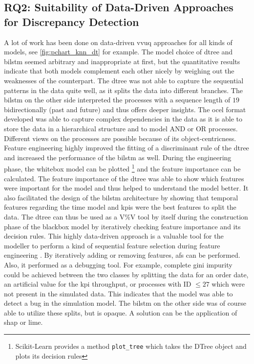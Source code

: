 \subsection{RQ2: Suitability of Data-Driven Approaches for Discrepancy Detection}
\label{sec:discussion_rq2}
A lot of work has been done on data-driven \gls{vvuq} approaches for all kinds of models, see \autoref{fig:pchart_knn_dt} for example. The model choice of \gls{dtree} and \gls{bilstm} seemed arbitrary and inappropriate at first, but the quantitative results indicate that both models complement each other nicely by weighing out the weaknesses of the counterpart. The \gls{dtree} was not able to capture the sequential patterns in the data quite well, as it splits the data into different branches. The \gls{bilstm} on the other side interpreted the processes with a sequence length of $19$ bidirectionally (past and future) and thus offers deeper insights. The \gls{ocel} format developed was able to capture complex dependencies in the data as it is able to store the data in a hierarchical structure and to model AND or OR processes. Different views on the processes are possible because of its object-centricness. Feature engineering highly improved the fitting of a discriminant rule of the \gls{dtree} and increased the performance of the \gls{bilstm} as well. During the engineering phase, the whitebox model can be plotted \footnote{Scikit-Learn provides a method \texttt{plot\_tree} which takes the DTree object and plots its decision rules} and the feature importance can be calculated. The feature importance of the \gls{dtree} was able to show which features were important for the model and thus helped to understand the model better. It also facilitated the design of the \gls{bilstm} architecture by showing that temporal features regarding the time model and \gls{kpi}s were the best features to split the data. The \gls{dtree} can thus be used as a V\%V tool by itself during the construction phase of the blackbox model by iteratively checking feature importance and its decision rules. This highly data-driven approach is a valuable tool for the modeller to perform a kind of sequential feature selection during feature engineering \autocite{pudil1994floating}. By iteratively adding or removing features, \gls{afs} can be performed. Also, it performed as a debugging tool. For example, complete gini impurity could be achieved between the two classes by splitting the data for an order date, an artificial value for the \gls{kpi} throughput, or processes with ID $\le 27$ which were not present in the simulated data. This indicates that the model was able to detect a bug in the simulation model. The \gls{bilstm} on the other side was of course able to utilize these splits, but is opaque. A solution can be the application of \gls{shap} or \gls{lime}.

